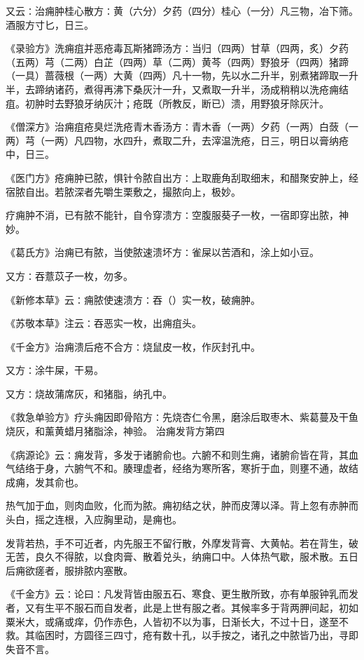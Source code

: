 \documentclass[a4paper,12pt,UTF8,twoside]{ctexbook}
\begin{document}
又云∶治痈肿桂心散方∶黄（六分）夕药（四分）桂心（一分）凡三物，冶下筛。酒服方寸匕，日三。

《录验方》洗痈疽并恶疮毒瓦斯猪蹄汤方∶当归（四两）甘草（四两，炙）夕药（五两）芎（二两）白芷（四两）草（二两）黄芩（四两）野狼牙（四两）猪蹄（一具）蔷薇根（一两）大黄（四两）凡十一物，先以水二升半，别煮猪蹄取一升半，去蹄纳诸药，煮得再沸下桑灰汁一升，又煮取一升半，汤成稍稍以洗疮痈结疽。初肿时去野狼牙纳灰汁；疮既（所教反，断已）溃，用野狼牙除灰汁。

《僧深方》治痈疽疮臭烂洗疮青木香汤方∶青木香（一两）夕药（一两）白蔹（一两）芎（一两）凡四物，水四升，煮取二升，去滓温洗疮，日三，明日以膏纳疮中，日三。

《医门方》疮痈肿已脓，惧针令脓自出方∶上取鹿角刮取细末，和醋聚安肿上，经宿脓自出。若脓深者先嚼生栗敷之，撮脓向上，极妙。

疗痈肿不消，已有脓不能针，自令穿溃方∶空腹服葵子一枚，一宿即穿出脓，神妙。

《葛氏方》治痈已有脓，当使脓速溃坏方∶雀屎以苦酒和，涂上如小豆。

又方∶吞薏苡子一枚，勿多。

《新修本草》云∶痈脓使速溃方∶吞（）实一枚，破痈肿。

《苏敬本草》注云∶吞恶实一枚，出痈疽头。

《千金方》治痈溃后疮不合方∶烧鼠皮一枚，作灰封孔中。

又方∶涂牛屎，干易。

又方∶烧故蒲席灰，和猪脂，纳孔中。

《救急单验方》疗头痈因即骨陷方∶先烧杏仁令黑，磨涂后取枣木、紫葛蔓及干鱼烧灰，和薰黄蜡月猪脂涂，神验。
治痈发背方第四

《病源论》云∶痈发背，多发于诸腑俞也。六腑不和则生痈，诸腑俞皆在背，其血气结络于身，六腑气不和。腠理虚者，经络为寒所客，寒折于血，则壅不通，故结成痈，发其俞也。

热气加于血，则肉血败，化而为脓。痈初结之状，肿而皮薄以泽。背上忽有赤肿而头白，摇之连根，入应胸里动，是痈也。

发背若热，手不可近者，内先服王不留行散，外摩发背膏、大黄帖。若在背生，破无苦，良久不得脓，以食肉膏、散着兑头，纳痈口中。人体热气歇，服术散。五日后痈欲瘥者，服排脓内塞散。

《千金方》云∶论曰∶凡发背皆由服五石、寒食、更生散所致，亦有单服钟乳而发者，又有生平不服石而自发者，此是上世有服之者。其候率多于背两胛间起，初如粟米大，或痛或痒，仍作赤色，人皆初不以为事，日渐长大，不过十日，遂至不救。其临困时，方圆径三四寸，疮有数十孔，以手按之，诸孔之中脓皆乃出，寻即失音不言。
\end{document}
